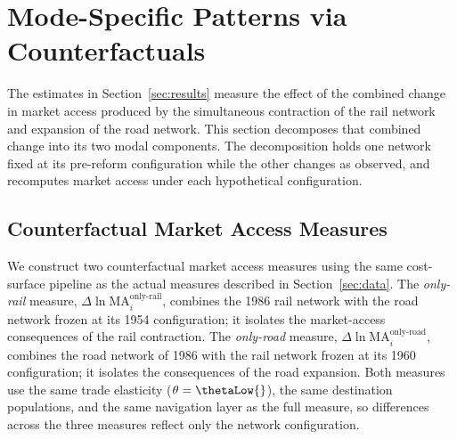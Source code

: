 %
%
%
%
%
%

\section{Mode-Specific Patterns via Counterfactuals}
\label{sec:counterfactuals}

The estimates in Section~\ref{sec:results} measure the effect of the
combined change in market access produced by the simultaneous
contraction of the rail network and expansion of the road network.
This section decomposes that combined change into its two modal
components. The decomposition holds one network fixed at its
pre-reform configuration while the other changes as observed, and
recomputes market access under each hypothetical configuration.

\subsection{Counterfactual Market Access Measures}
\label{sec:cf_construction}

We construct two counterfactual market access measures using the same
cost-surface pipeline as the actual measures described in
Section~\ref{sec:data}. The \emph{only-rail} measure,
$\Delta \ln \mathrm{MA}^{\text{only-rail}}_i$, combines the 1986 rail
network with the road network frozen at its 1954 configuration; it
isolates the market-access consequences of the rail contraction. The
\emph{only-road} measure,
$\Delta \ln \mathrm{MA}^{\text{only-road}}_i$,
combines the road network of 1986 with the rail network frozen at its
1960 configuration; it isolates the consequences of the road
expansion. Both measures use the same trade elasticity
($\theta = \thetaLow{}$), the same destination populations, and the same
navigation layer as the full measure, so differences across the three
measures reflect only the network configuration.

